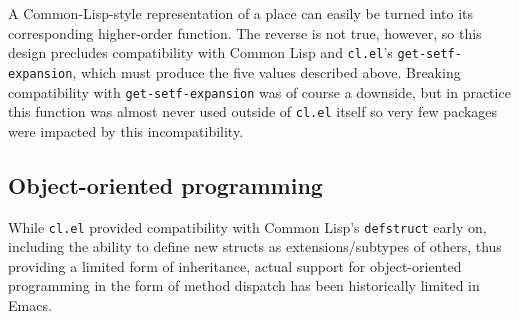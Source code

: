 \documentclass[format=acmsmall, review]{acmart}
\begin{document}
A Common-Lisp-style representation of a place can easily be turned into
its corresponding higher-order function.  The reverse is not true, however, so
this design precludes compatibility with Common Lisp and
\texttt{cl.el}'s \texttt{get-setf-expansion}, which must produce the
five values described above.
Breaking compatibility with \texttt{get-setf-expansion}
was of course
a downside, but in practice this function was almost never used outside of
\texttt{cl.el} itself so very few packages were impacted by
this incompatibility.


\subsection{Object-oriented programming} %
\label{sec:oop}

While \texttt{cl.el} provided compatibility with Common
Lisp's \texttt{defstruct} early on, including the
ability to define new structs as extensions/subtypes of others, thus
providing a limited form of inheritance, actual support for object-oriented
programming in the form of method dispatch has been historically limited
in Emacs.
\end{document}
